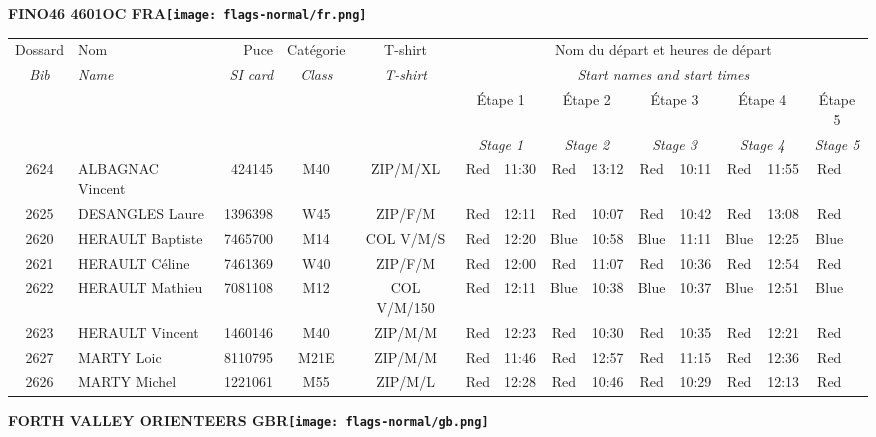 \documentclass{report}
\begin{document}
\newpage
  \Huge \centering \bfseries FINO46 4601OC FRA\normalfont \footnotesize \sffamily \hfill \texttt{[image: flags-normal/fr.png]} \newline 
  \begin{longtable}{|c|l|r|c|c|*{5}{cc|}}
    Dossard & Nom  & Puce    & Catégorie & T-shirt & \multicolumn{10}{c|}{Nom du départ et heures de départ} \\
    \itshape Bib     & \itshape Name & \itshape SI card & \itshape Class  & \itshape  T-shirt  & \multicolumn{10}{c|}{\itshape Start names and start times} \\
    \hline
    & & & & & \multicolumn{2}{c|}{Étape 1} & \multicolumn{2}{c|}{Étape 2} & \multicolumn{2}{c|}{Étape 3} & \multicolumn{2}{c|}{Étape 4} & \multicolumn{2}{c|}{Étape 5} \\
    & & & & & \multicolumn{2}{c|}{\itshape Stage 1} & \multicolumn{2}{c|}{\itshape Stage 2} & \multicolumn{2}{c|}{\itshape Stage 3} & \multicolumn{2}{c|}{\itshape Stage 4} & \multicolumn{2}{c|}{\itshape Stage 5} \\
    \hline
    2624 & ALBAGNAC Vincent & 424145 & M40 & ZIP/M/XL & Red & 11:30 & Red & 13:12 & Red & 10:11 & Red & 11:55 & Red &  \\
    2625 & DESANGLES Laure & 1396398 & W45 & ZIP/F/M & Red & 12:11 & Red & 10:07 & Red & 10:42 & Red & 13:08 & Red &  \\
    2620 & HERAULT Baptiste & 7465700 & M14 & COL V/M/S & Red & 12:20 & Blue & 10:58 & Blue & 11:11 & Blue & 12:25 & Blue &  \\
    2621 & HERAULT Céline & 7461369 & W40 & ZIP/F/M & Red & 12:00 & Red & 11:07 & Red & 10:36 & Red & 12:54 & Red &  \\
    2622 & HERAULT Mathieu & 7081108 & M12 & COL V/M/150 & Red & 12:11 & Blue & 10:38 & Blue & 10:37 & Blue & 12:51 & Blue &  \\
    2623 & HERAULT Vincent & 1460146 & M40 & ZIP/M/M & Red & 12:23 & Red & 10:30 & Red & 10:35 & Red & 12:21 & Red &  \\
    2627 & MARTY Loic & 8110795 & M21E & ZIP/M/M & Red & 11:46 & Red & 12:57 & Red & 11:15 & Red & 12:36 & Red &  \\
    2626 & MARTY Michel & 1221061 & M55 & ZIP/M/L & Red & 12:28 & Red & 10:46 & Red & 10:29 & Red & 12:13 & Red &  \\
  \end{longtable}
\newpage
  \Huge \centering \bfseries FORTH VALLEY ORIENTEERS  GBR\normalfont \footnotesize \sffamily \hfill \texttt{[image: flags-normal/gb.png]} \newline 
\end{document}
